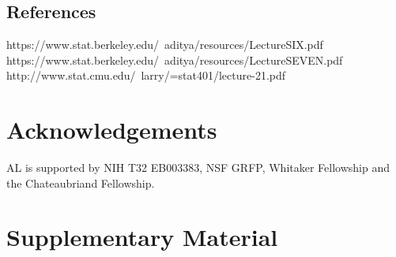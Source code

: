 \documentclass{article}
\theoremstyle{definition}
\theoremstyle{remark}
\newcommand{\beginsupplement}{%
        \setcounter{table}{0}
        \renewcommand{\thetable}{S\arabic{table}}%
        \setcounter{figure}{0}
        \renewcommand{\thefigure}{S\arabic{figure}}%
     }
\begin{document}
	\subsection{References}
		https://www.stat.berkeley.edu/~aditya/resources/LectureSIX.pdf
		https://www.stat.berkeley.edu/~aditya/resources/LectureSEVEN.pdf
		http://www.stat.cmu.edu/~larry/=stat401/lecture-21.pdf
\section{Acknowledgements}
  
  AL is supported by NIH T32 EB003383, NSF GRFP, Whitaker Fellowship and the Chateaubriand Fellowship. 

\newpage
\section{Supplementary Material}
\beginsupplement
  
\clearpage
\newpage
  
\end{document}
